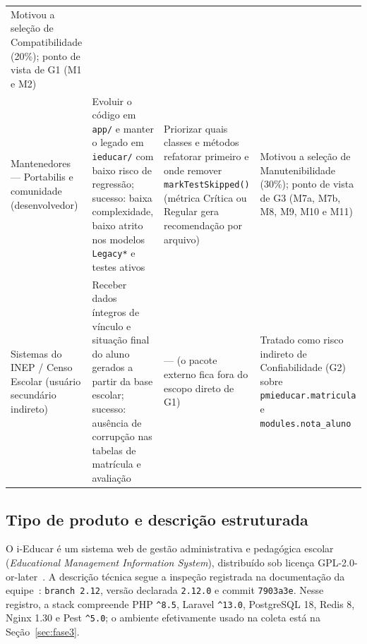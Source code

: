 \documentclass[conference]{model/IEEEtran}%
\begin{document}
\begin{table}[!t]
\begin{tabular}{@{}L{2.8cm}L{4.8cm}L{4.8cm}L{4.4cm}@{}}
Motivou a seleção de Compatibilidade (20\%); ponto de vista de G1 (M1 e M2) \\
\addlinespace[2pt]
Mantenedores --- Portabilis e comunidade (desenvolvedor) &
Evoluir o código em \texttt{app/} e manter o legado em \texttt{ieducar/} com baixo risco de regressão; sucesso: baixa complexidade, baixo atrito nos modelos \texttt{Legacy*} e testes ativos &
Priorizar quais classes e métodos refatorar primeiro e onde remover \texttt{markTestSkipped()} (métrica Crítica ou Regular gera recomendação por arquivo) &
Motivou a seleção de Manutenibilidade (30\%); ponto de vista de G3 (M7a, M7b, M8, M9, M10 e M11) \\
\addlinespace[2pt]
Sistemas do INEP / Censo Escolar (usuário secundário indireto) &
Receber dados íntegros de vínculo e situação final do aluno gerados a partir da base escolar; sucesso: ausência de corrupção nas tabelas de matrícula e avaliação &
--- (o pacote externo  fica fora do escopo direto de G1) &
Tratado como risco indireto de Confiabilidade (G2) sobre \texttt{pmieducar.matricula} e \texttt{modules.nota\_aluno} \\
\bottomrule
\end{tabular}
\end{table}

\subsection{Tipo de produto e descrição estruturada}
O i-Educar é um sistema web de gestão administrativa e pedagógica escolar (\textit{Educational Management Information System}), distribuído sob licença GPL-2.0-or-later~\cite{ieducar_repo,bid_ieducar}. A descrição técnica segue a inspeção registrada na documentação da equipe~\cite{gracehopper_pc1}: \texttt{branch 2.12}, versão declarada \texttt{2.12.0} e commit \texttt{7903a3e}. Nesse registro, a stack compreende PHP \texttt{\^{}8.5}, Laravel \texttt{\^{}13.0}, PostgreSQL 18, Redis 8, Nginx 1.30 e Pest \texttt{\^{}5.0}; o ambiente efetivamente usado na coleta está na Seção~\ref{sec:fase3}.
\end{document}
